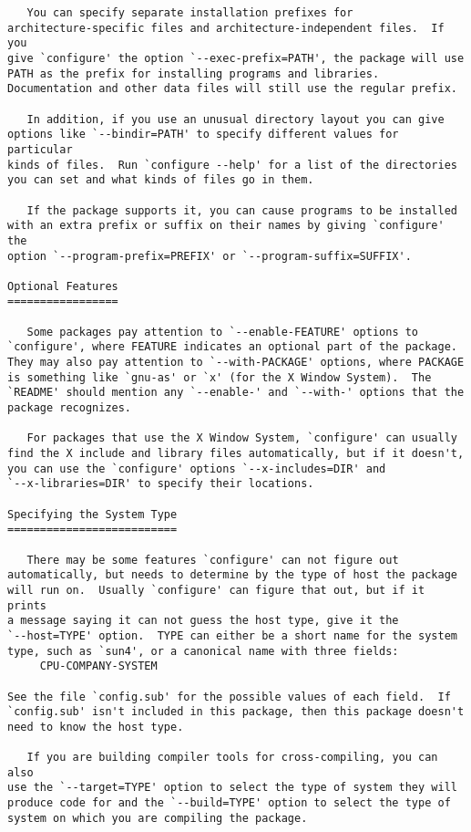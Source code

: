 \begin{verbatim}
   You can specify separate installation prefixes for
architecture-specific files and architecture-independent files.  If you
give `configure' the option `--exec-prefix=PATH', the package will use
PATH as the prefix for installing programs and libraries.
Documentation and other data files will still use the regular prefix.

   In addition, if you use an unusual directory layout you can give
options like `--bindir=PATH' to specify different values for particular
kinds of files.  Run `configure --help' for a list of the directories
you can set and what kinds of files go in them.

   If the package supports it, you can cause programs to be installed
with an extra prefix or suffix on their names by giving `configure' the
option `--program-prefix=PREFIX' or `--program-suffix=SUFFIX'.

Optional Features
=================

   Some packages pay attention to `--enable-FEATURE' options to
`configure', where FEATURE indicates an optional part of the package.
They may also pay attention to `--with-PACKAGE' options, where PACKAGE
is something like `gnu-as' or `x' (for the X Window System).  The
`README' should mention any `--enable-' and `--with-' options that the
package recognizes.

   For packages that use the X Window System, `configure' can usually
find the X include and library files automatically, but if it doesn't,
you can use the `configure' options `--x-includes=DIR' and
`--x-libraries=DIR' to specify their locations.

Specifying the System Type
==========================

   There may be some features `configure' can not figure out
automatically, but needs to determine by the type of host the package
will run on.  Usually `configure' can figure that out, but if it prints
a message saying it can not guess the host type, give it the
`--host=TYPE' option.  TYPE can either be a short name for the system
type, such as `sun4', or a canonical name with three fields:
     CPU-COMPANY-SYSTEM

See the file `config.sub' for the possible values of each field.  If
`config.sub' isn't included in this package, then this package doesn't
need to know the host type.

   If you are building compiler tools for cross-compiling, you can also
use the `--target=TYPE' option to select the type of system they will
produce code for and the `--build=TYPE' option to select the type of
system on which you are compiling the package.


\end{verbatim}
